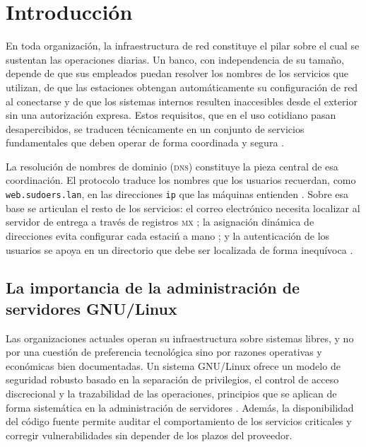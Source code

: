 
\section{Introducci\'on}

En toda organizaci\'on, la infraestructura de red constituye el pilar
sobre el cual se sustentan las operaciones diarias. Un banco, con
independencia de su tama\~no, depende de que sus empleados puedan resolver
los nombres de los servicios que utilizan, de que las estaciones obtengan
autom\'aticamente su configuraci\'on de red al conectarse y de que los
sistemas internos resulten inaccesibles desde el exterior sin una
autorizaci\'on expresa. Estos requisitos, que en el uso cotidiano pasan
desapercibidos, se traducen t\'ecnicamente en un conjunto de servicios
fundamentales que deben operar de forma coordinada y segura
\cite{tanenbaum2017}.

La resoluci\'on de nombres de dominio (\textsc{dns}) constituye la pieza
central de esa coordinaci\'on. El protocolo traduce los nombres que los
usuarios recuerdan, como \texttt{web.sudoers.lan}, en las direcciones
\texttt{ip} que las m\'aquinas entienden \cite{rfc1034, rfc1035}. Sobre esa
base se articulan el resto de los servicios: el correo electr\'onico
necesita localizar al servidor de entrega a trav\'es de registros
\textsc{mx} \cite{postel1982, criden2005}; la asignaci\'on din\'amica de
direcciones evita configurar cada estaci\'n a mano \cite{rfc2131, droms1997};
y la autenticaci\'on de los usuarios se apoya en un directorio que debe ser
localizada de forma inequ\'ivoca \cite{rfc4511, rfc4120}.

\subsection{La importancia de la administraci\'on de servidores GNU/Linux}

Las organizaciones actuales operan su infraestructura sobre sistemas
libres, y no por una cuesti\'on de preferencia tecnol\'ogica sino por
razones operativas y econ\'omicas bien documentadas. Un sistema GNU/Linux
ofrece un modelo de seguridad robusto basado en la separaci\'on de
privilegios, el control de acceso discrecional y la trazabilidad de las
operaciones, principios que se aplican de forma sistem\'atica en la
administraci\'on de servidores \cite{stewart2017}. Adem\'as, la
disponibilidad del c\'odigo fuente permite auditar el comportamiento de los
servicios criticales y corregir vulnerabilidades sin depender de los
plazos del proveedor.

